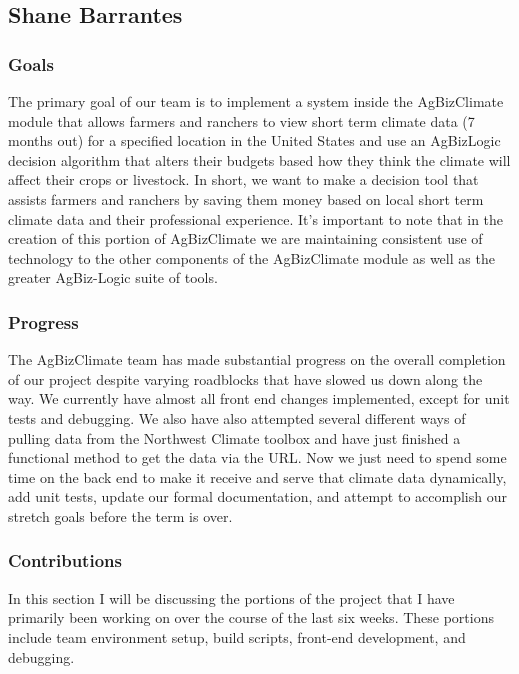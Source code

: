 \documentclass[onecolumn, draftclsnofoot,10pt, compsoc]{article}
\begin{document}
\subsection{Shane Barrantes}
	\subsubsection{Goals}
        The primary goal of our team is to implement a system inside the AgBizClimate module that allows farmers and ranchers to view short term climate data (7 months out) for a specified location in the United States and use an AgBizLogic decision algorithm that alters their budgets based how they think the climate will affect their crops or livestock. In short, we want to make a decision tool that assists farmers and ranchers by saving them money based on local short term climate data and their professional experience. It's important to note that in the creation of this portion of AgBizClimate we are maintaining consistent use of technology to the other components of the AgBizClimate module as well as the greater AgBiz-Logic suite of tools.
        \subsubsection{Progress}
	The AgBizClimate team has made substantial progress on the overall completion of our project despite varying roadblocks that have slowed us down along the way. We currently have almost all front end changes implemented, except for unit tests and debugging. We also have also attempted several different ways of pulling data from the Northwest Climate toolbox and have just finished a functional method to get the data via the URL. Now we just need to spend some time on the back end to make it receive and serve that climate data dynamically, add unit tests, update our formal documentation, and attempt to accomplish our stretch goals before the term is over.
	\subsubsection{Contributions}
	In this section I will be discussing the portions of the project that I have primarily been working on over the course of the last six weeks. These portions include team environment setup, build scripts, front-end development, and debugging.
\end{document}

